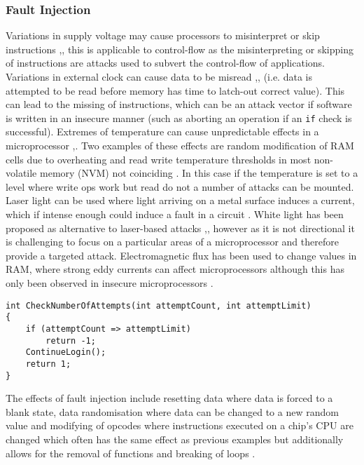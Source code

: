 \subsubsection*{Fault Injection}

Variations in supply voltage may cause processors to misinterpret or skip instructions \cite{Anderson1996},\cite{Blomer2010}, this is applicable to control-flow as the misinterpreting or skipping of instructions are attacks used to subvert the control-flow of applications.
Variations in external clock can cause data to be misread \cite{Anderson1996},\cite{Street},\cite{Kommerling1999} (i.e. data is attempted to be read before memory has time to latch-out correct value). This can lead to the missing of instructions, which can be an attack vector if software is written in an insecure manner (such as aborting an operation if an \verb|if| check is successful).
Extremes of temperature can cause unpredictable effects in a microprocessor \cite{Boneh},\cite{Govindavajhala2003}. Two examples of these effects are random modification of RAM cells due to overheating and read write temperature thresholds in most non-volatile memory (NVM) not coinciding \cite{Bar-el2006}. In this case if the temperature is set to a level where write ops work but read do not a number of attacks can be mounted. Laser light can be used where light arriving on a metal surface induces a current, which if intense enough could induce a fault in a circuit \cite{Habing1965}. White light has been proposed as alternative to laser-based attacks \cite{Anderson1996},\cite{Skorobogatov2007}, however as it is not directional it is challenging to focus on a particular areas of a microprocessor and therefore provide a targeted attack. Electromagnetic flux has been used to change values in RAM, where strong eddy currents can affect microprocessors although this has only been observed in insecure microprocessors \cite{Samyde2003}.

\begin{lstlisting}[language={[Sharp]C},caption={An example of code which is vulnerable to skipping of instructions},label={lst:instructionSkip}]
int CheckNumberOfAttempts(int attemptCount, int attemptLimit)
{
    if (attemptCount => attemptLimit)
        return -1;
    ContinueLogin();
    return 1;
}
\end{lstlisting}

The effects of fault injection include resetting data where data is forced to a blank state, data randomisation where data can be changed to a new random value and modifying of opcodes where instructions executed on a chip's CPU are changed which often has the same effect as previous examples but additionally allows for the removal of functions and breaking of loops \cite{Anderson1996}. 
\ifnotesincluded
{}
\fi
  

